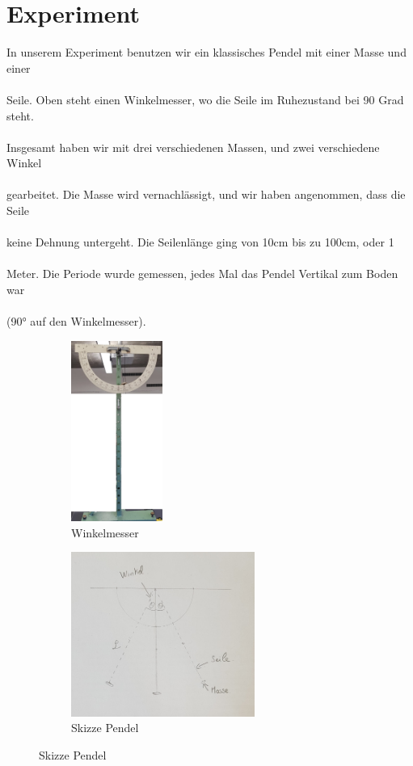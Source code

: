 \documentclass[12pt, a4paper, twoside]{article}
\begin{document}
    \section{Experiment}
    In unserem Experiment benutzen wir ein klassisches Pendel mit einer Masse und einer\\\\
    Seile. Oben steht einen Winkelmesser, wo die Seile im Ruhezustand bei 90 Grad steht.\\\\
    Insgesamt haben wir mit drei verschiedenen Massen, und zwei verschiedene Winkel\\\\
    gearbeitet. Die Masse wird vernachlässigt, und wir haben angenommen, dass die Seile\\\\
    keine Dehnung untergeht. Die Seilenlänge ging von 10cm bis zu 100cm, oder 1\\\\
    Meter. Die Periode wurde gemessen, jedes Mal das Pendel Vertikal zum Boden war\\\\
    (90° auf den Winkelmesser). 
    \vfill
    \begin{figure}[h!]
        \begin{subfigure}{.5\textwidth}
            \centering
            \includegraphics[scale=0.25, width=3cm]{Winkelmesser.png}
            \caption{Winkelmesser}
            \label{fig:winkelmesser}
        \end{subfigure}
        \begin{subfigure}{.5\textwidth}
            \centering
            \includegraphics[scale=0.5, width=6cm]{Pendulum.jpeg}
            \caption{Skizze Pendel}
            \label{fig:Pendulum}
        \end{subfigure}
    \end{figure}
    \newpage
\end{document}
